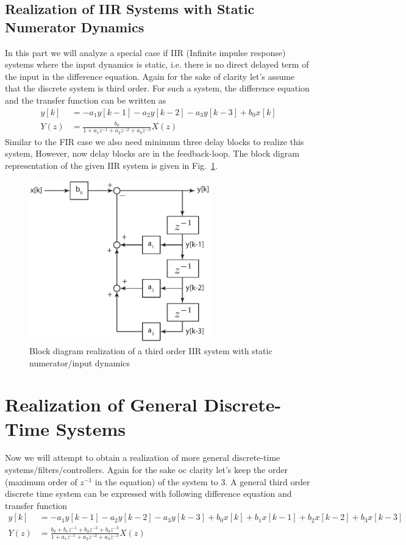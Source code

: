 \documentclass[twoside]{article}
\begin{document}
\subsection*{Realization of IIR Systems with Static Numerator Dynamics}
%
In this part we will analyze a special case if IIR (Infinite impulse
response) systems where the input dynamics is static, i.e. there is no 
direct delayed term of the input in the difference equation. Again for
the sake of clarity let's assume that the discrete system is third
order. For such a system, the difference equation and the transfer
function can be written as
%
\begin{align*}
y[k] &= -a_1 y[k-1] - a_2 y[k-2] - a_3 y[k-3] + b_0 x[k] \\ 
Y(z) &= \frac{b_0}{1 +  a_1 z^{-1} + a_2 z^{-2} + a_3 z^{-3} } X(z)
\end{align*}
%
Similar to the FIR case we also need minimum three delay blocks to
realize this system, However, now delay blocks are in the
feedback-loop. The block digram representation of the given IIR system
is given in Fig.~\ref{fig:IIR}.
%
\begin{figure}[h]
    \centering
      \includegraphics[width=0.7\textwidth]{IIR}
    \caption{Block diagram realization of a third order IIR system
      with static numerator/input dynamics}
        \label{fig:IIR}
\end{figure}

\newpage

\section*{Realization of General Discrete-Time Systems}

Now we will attempt to obtain a realization of more general
discrete-time systems/filters/controllers. Again for the sake
oc clarity let's keep the order (maximum order of $z^{-1}$ in the
equation) of the system to 3. A general third order discrete time
system can be expressed with following difference equation
and transfer function
%
\begin{align*}
y[k] &=  -a_1 y[k-1] - a_2 y[k-2] - a_3 y[k-3] 
+ b_0 x[k] + b_1 x[k-1] + b_2 x[k-2] + b_3 x[k-3] \\ 
Y(z) &= \frac{b_0 + b_1 z^{-1} + b_2 z^{-2} + b_3 z^{-3}}{1+ a_1 z^{-1} + a_2 z^{-2} + a_3 z^{-3}} X(z)
\end{align*}
%
 
\end{document}
